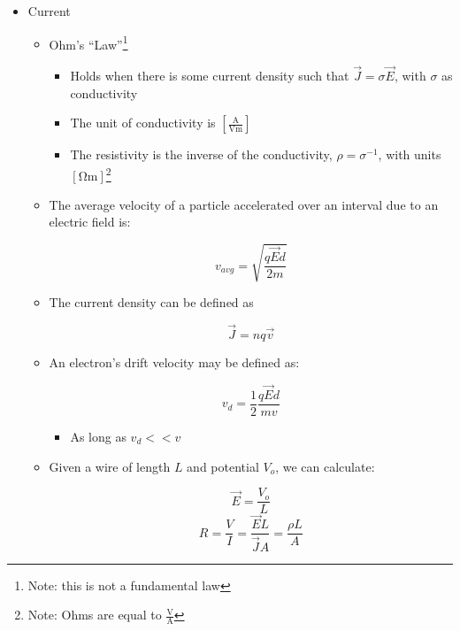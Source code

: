 \begin{itemize}

  \item Current
    
    \begin{itemize}

      \item Ohm's ``Law''\footnote{Note: this is not a fundamental law}

        \begin{itemize}

          \item Holds when there is some current density such that $\vec{J}=\sigma\vec{E}$, with $\sigma$ as conductivity

          \item The unit of conductivity is $\left[ \frac{\si{\ampere}}{\si{\volt\meter}} \right]$

          \item The resistivity is the inverse of the conductivity, $\rho=\sigma^{-1}$, with units $\left[ \si{\ohm\meter} \right]$\footnote{Note: Ohms are equal to $\frac{\si{\volt}}{\si{\ampere}}$}

        \end{itemize}

      \item The average velocity of a particle accelerated over an interval due to an electric field is:

        $$v_{avg}=\sqrt{\frac{q\vec{E}d}{2m}}$$

      \item The current density can be defined as

        $$\vec{J}=nq\vec{v}$$

      \item An electron's drift velocity may be defined as:

        $$v_d=\frac{1}{2}\frac{q\vec{E}d}{mv}$$

        \begin{itemize}

          \item As long as $v_d<<v$

        \end{itemize}

      \item Given a wire of length $L$ and potential $V_o$, we can calculate:

        $$\vec{E}=\frac{V_o}{L}$$
        $$R=\frac{V}{I}=\frac{\vec{E}L}{\vec{J}A}=\frac{\rho L}{A}$$


\end{itemize}
\end{itemize}
